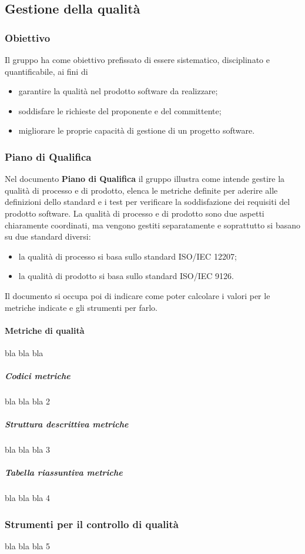 \subsection{Gestione della qualità}
\subsubsection{Obiettivo}
Il gruppo \Gruppo{} ha come obiettivo prefissato di essere sistematico, disciplinato e quantificabile, ai fini di 
\begin{itemize}
    \item garantire la qualità nel prodotto software da realizzare;
    \item soddisfare le richieste del proponente e del committente;
    \item migliorare le proprie capacità di gestione di un progetto software.
\end{itemize}

\subsubsection{Piano di Qualifica}
Nel documento \textbf{Piano di Qualifica} il gruppo illustra come intende gestire la qualità di processo e di prodotto, elenca le metriche definite per aderire alle definizioni dello standard e i test per verificare la soddisfazione dei requisiti del prodotto software.
La qualità di processo e di prodotto sono due aspetti chiaramente coordinati, ma vengono gestiti separatamente e soprattutto si basano su due standard diversi:
\begin{itemize}
    \item la qualità di processo si basa sullo standard ISO/IEC 12207;
    \item la qualità di prodotto si basa sullo standard ISO/IEC 9126.
\end{itemize}
Il documento si occupa poi di indicare come poter calcolare i valori per le metriche indicate e gli strumenti per farlo.

\setlength{\parindent}{-0.1em}
\paragraph{Metriche di qualità}
bla bla bla
\subparagraph{Codici metriche}
bla bla bla 2
\subparagraph{Struttura descrittiva metriche}
bla bla bla 3
\subparagraph{Tabella riassuntiva metriche}
bla bla bla 4

\subsubsection{Strumenti per il controllo di qualità}
bla bla bla 5